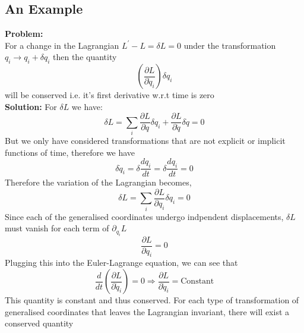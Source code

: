 \subsection{An Example}
\begin{tcolorbox}
    \textbf{Problem:} \\
    For a change in the Lagrangian $L^{'} - L = \delta L = 0 $ under the transformation $q_{i} \rightarrow q_{i} + \delta q_{i}$ then the quantity
    \begin{equation}
        \left(\frac{\partial L}{\partial \dot{q}_{i}}\right) \delta q_{i}
    \end{equation}
    will be conserved i.e. it's first derivative w.r.t time is zero \\
    \textbf{Solution:}
For $\delta L$ we have:
\begin{equation}
    \delta L = \sum_{i} \frac{\partial L}{\partial q}\delta q_{i} + \frac{\partial L}{\partial \dot{q}} \delta \dot{q} = 0
\end{equation}
But we only have considered transformations that are not explicit or implicit functions of time, therefore we have
\begin{equation}
    \delta \dot{q}_{i} = \delta \frac{d q_{i}}{dt} = \delta \frac{d q_{i}}{dt} = 0 
\end{equation}
Therefore the variation of the Lagrangian becomes,
\begin{equation}
    \delta L =  \sum_{i} \frac{\partial L}{\partial q_{i}} \delta q_{i} = 0
\end{equation}
Since each of the generalised coordinates undergo indpendent displacements, $\delta L$ must vanish for each term of $\partial_{q_{i}}L$
\begin{equation}
    \frac{\partial L}{\partial q_{i}} = 0
\end{equation}
Plugging this into the Euler-Lagrange equation, we can see that
\begin{equation}
    \frac{d}{dt} \left( \frac{\partial L}{\partial \dot{q}_{i}} \right) = 0 \Rightarrow \frac{\partial L}{\partial \dot{q}_{i}} = \text{Constant}
\end{equation}
This quantity is constant and thus conserved. For each type of transformation of generalised coordinates that leaves the Lagrangian invariant, there will exist a conserved quantity
\end{tcolorbox}
